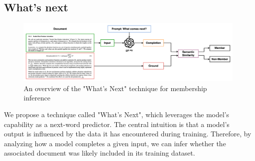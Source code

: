 \documentclass[sigconf]{acmart}
\begin{document}


\subsection{What's next}

\begin{figure}[htp]
  \centering
  \includegraphics[width=\textwidth]{figures/completion.drawio.png}
    \caption{An overview of the "What's Next" technique for membership inference}
    \label{fig:completion}
\end{figure}

We propose a technique called "What’s Next", which leverages the model’s capability as a next-word predictor. The central intuition is that a model’s output is influenced by the data it has encountered during training. Therefore, by analyzing how a model completes a given input, we can infer whether the associated document was likely included in its training dataset.
\end{document}
